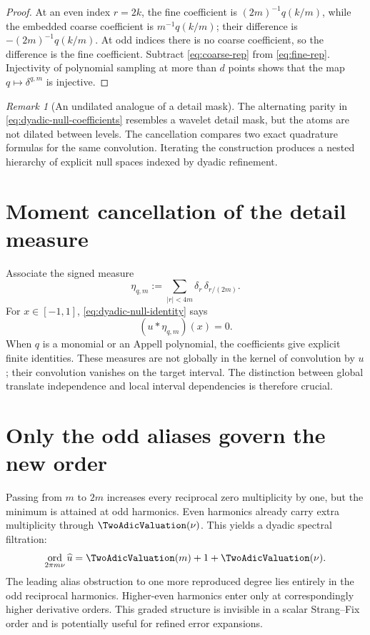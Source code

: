 \documentclass[11pt,oneside]{book}
\theoremstyle{definition}
\theoremstyle{remark}
\newtheorem{remark}[theorem]{Remark}
\DeclareMathOperator{\ord}{ord}
\begin{document}
\begin{proof}
At an even index \(r=2k\), the fine coefficient is
\((2m)^{-1}q(k/m)\), while the embedded coarse coefficient is
\(m^{-1}q(k/m)\); their difference is
\(-(2m)^{-1}q(k/m)\).  At odd indices there is no coarse coefficient, so the difference is the fine coefficient.  Subtract \cref{eq:coarse-rep} from \cref{eq:fine-rep}.  Injectivity of polynomial sampling at more than \(d\) points shows that the map \(q\mapsto\delta^{q,m}\) is injective.
\end{proof}

\begin{remark}[An undilated analogue of a detail mask]
The alternating parity in \cref{eq:dyadic-null-coefficients} resembles a wavelet detail mask, but the atoms are not dilated between levels.  The cancellation compares two exact quadrature formulas for the same convolution.  Iterating the construction produces a nested hierarchy of explicit null spaces indexed by dyadic refinement.
\end{remark}

\section{Moment cancellation of the detail measure}
Associate the signed measure
\begin{equation}
 \eta_{q,m}:=\sum_{|r|<4m}\delta_r\,\delta_{r/(2m)}.
 \label{eq:detail-measure}
\end{equation}
For \(x\in[-1,1]\), \cref{eq:dyadic-null-identity} says
\begin{equation}
 (u*\eta_{q,m})(x)=0.
 \label{eq:convolution-null-measure}
\end{equation}
When \(q\) is a monomial or an Appell polynomial, the coefficients give explicit finite identities.  These measures are not globally in the kernel of convolution by \(u\); their convolution vanishes on the target interval.  The distinction between global translate independence and local interval dependencies is therefore crucial.

\section{Only the odd aliases govern the new order}
Passing from \(m\) to \(2m\) increases every reciprocal zero multiplicity by one, but the minimum is attained at odd harmonics.  Even harmonics already carry extra multiplicity through \(\TwoAdicValuation(\nu)\).  This yields a dyadic spectral filtration:
\begin{equation}
 \ord_{2\pi m\nu}\widehat u
 =\TwoAdicValuation(m)+1+\TwoAdicValuation(\nu).
 \label{eq:spectral-filtration}
\end{equation}
The leading alias obstruction to one more reproduced degree lies entirely in the odd reciprocal harmonics.  Higher-even harmonics enter only at correspondingly higher derivative orders.  This graded structure is invisible in a scalar Strang--Fix order and is potentially useful for refined error expansions.
\end{document}
